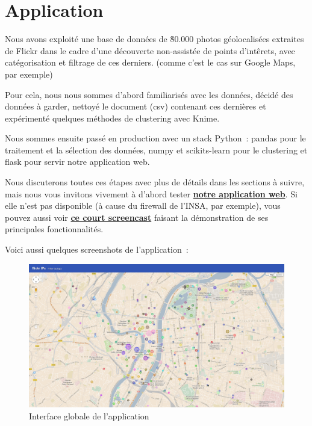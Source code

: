 \chapter{Application}

    Nous avons exploité une base de données de \~80.000 photos géolocalisées extraites de Flickr dans le cadre d'une découverte
    non-assistée de points d'intêrets, avec catégorisation et filtrage de ces derniers. (comme c'est le cas sur Google Maps, par exemple)

    Pour cela, nous nous sommes d'abord familiarisés avec les données, décidé des données à garder, nettoyé le document (csv) contenant ces dernières et expérimenté quelques méthodes de clustering avec Knime.

    Nous sommes ensuite passé en production avec un stack Python~: pandas pour le traitement et la sélection des données, numpy et scikits-learn pour le clustering et flask pour servir notre application web.

    Nous discuterons toutes ces étapes avec plus de détails dans les sections à suivre, mais nous vous invitons vivement à d'abord
    tester \href{http://188.226.171.22:5000}{\textbf{notre application web}}. Si elle n'est pas disponible (à cause du firewall de
    l'INSA, par exemple), vous pouvez aussi voir \href{http://www.youtube.com/watch?v=DjlNwlbRyMo}{\textbf{ce court screencast}} faisant la démonstration de ses principales fonctionnalités.

    Voici aussi quelques screenshots de l'application~:

    \begin{figure}[H]
        \centering
        \includegraphics[scale=0.25]{../screenshots/ui-global.png}
        \caption{Interface globale de l'application}
        \label{diagram:ui-global}
    \end{figure}


